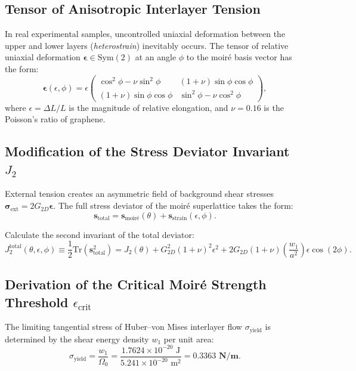 \documentclass[12pt,a4paper]{article}
\begin{document}
				\subsection{Tensor of Anisotropic Interlayer Tension}
				In real experimental samples, uncontrolled uniaxial deformation between the upper and lower layers (\textit{heterostrain}) inevitably occurs. The tensor of relative uniaxial deformation $\boldsymbol{\epsilon} \in \mathrm{Sym}(2)$ at an angle $\phi$ to the moiré basis vector has the form:
				\begin{equation}
					\boldsymbol{\epsilon}(\epsilon, \phi) = \epsilon \begin{pmatrix} 
						\cos^2\phi - \nu \sin^2\phi & (1+\nu)\sin\phi\cos\phi \\ 
						(1+\nu)\sin\phi\cos\phi & \sin^2\phi - \nu \cos^2\phi 
					\end{pmatrix},
				\end{equation}
				where $\epsilon = \Delta L / L$ is the magnitude of relative elongation, and $\nu = 0.16$ is the Poisson's ratio of graphene.
				
				\subsection{Modification of the Stress Deviator Invariant $J_2$}
				External tension creates an asymmetric field of background shear stresses $\boldsymbol{\sigma}_{\text{ext}} = 2 G_{2D} \boldsymbol{\epsilon}$. The full stress deviator of the moiré superlattice takes the form:
				\begin{equation}
					\mathbf{s}_{\text{total}} = \mathbf{s}_{\text{moir\'e}}(\theta) + \mathbf{s}_{\text{strain}}(\epsilon, \phi).
				\end{equation}
				
				Calculate the second invariant of the total deviator:
				\begin{equation}
					J_2^{\text{total}}(\theta, \epsilon, \phi) \equiv \frac{1}{2}\mathrm{Tr}(\mathbf{s}_{\text{total}}^2) = J_2(\theta) + G_{2D}^2 (1+\nu)^2 \epsilon^2 + 2 G_{2D} (1+\nu) \left(\frac{w_1}{a^2}\right) \epsilon \cos(2\phi).
				\end{equation}
				
				\subsection{Derivation of the Critical Moiré Strength Threshold $\epsilon_{\text{crit}}$}
				The limiting tangential stress of Huber--von Mises interlayer flow $\sigma_{\text{yield}}$ is determined by the shear energy density $w_1$ per unit area:
				\begin{equation}
					\sigma_{\text{yield}} = \frac{w_1}{\Omega_0} = \frac{1.7624 \times 10^{-20}\text{ J}}{5.241 \times 10^{-20}\text{ m}^2} = \mathbf{0.3363\text{ N/m}}.
				\end{equation}
				
\end{document}

